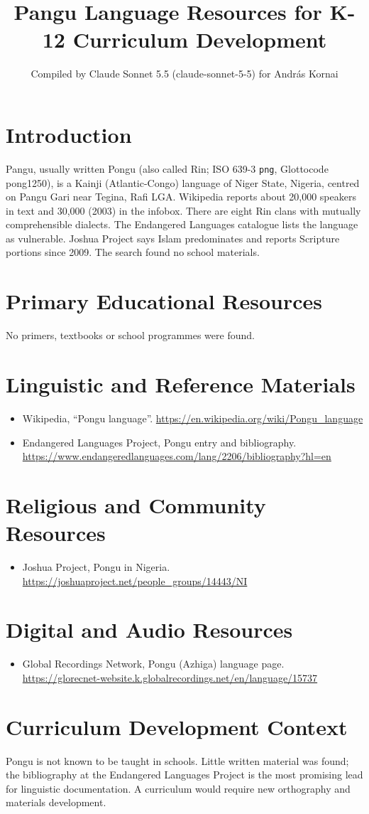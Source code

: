 \documentclass[12pt]{article}
\title{Pangu Language Resources for K-12 Curriculum Development}
\author{Compiled by Claude Sonnet 5.5 (claude-sonnet-5-5) for Andr\'as Kornai}
\date{}
\begin{document}
\maketitle

\section{Introduction}
Pangu, usually written Pongu (also called Rin; ISO 639-3 \texttt{png}, Glottocode pong1250), is a Kainji (Atlantic-Congo) language of Niger State, Nigeria, centred on Pangu Gari near Tegina, Rafi LGA. Wikipedia reports about 20,000 speakers in text and 30,000 (2003) in the infobox. There are eight Rin clans with mutually comprehensible dialects. The Endangered Languages catalogue lists the language as vulnerable. Joshua Project says Islam predominates and reports Scripture portions since 2009. The search found no school materials.

\section{Primary Educational Resources}
No primers, textbooks or school programmes were found.

\section{Linguistic and Reference Materials}
\begin{itemize}
\item Wikipedia, ``Pongu language''. \url{https://en.wikipedia.org/wiki/Pongu_language}
\item Endangered Languages Project, Pongu entry and bibliography. \url{https://www.endangeredlanguages.com/lang/2206/bibliography?hl=en}
\end{itemize}

\section{Religious and Community Resources}
\begin{itemize}
\item Joshua Project, Pongu in Nigeria. \url{https://joshuaproject.net/people_groups/14443/NI}
\end{itemize}

\section{Digital and Audio Resources}
\begin{itemize}
\item Global Recordings Network, Pongu (Azhiga) language page. \url{https://glorecnet-website.k.globalrecordings.net/en/language/15737}
\end{itemize}

\section{Curriculum Development Context}
Pongu is not known to be taught in schools. Little written material was found; the bibliography at the Endangered Languages Project is the most promising lead for linguistic documentation. A curriculum would require new orthography and materials development.
\end{document}
